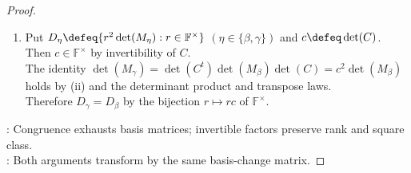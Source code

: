 \begin{proposition}
\begin{proof}
\begin{enumerate}[label=(\roman*)]
Thus $\operatorname{rank}(M_{\gamma})=\operatorname{rank}(M_{\beta})$ by (ii) and Theorem \ref{thm:full-rank-products-preserve-rank}(ii).
\item[$(v)$] Put $D_{\eta}\defeq\{r^2\det(M_{\eta}):r\in\mathbb{F}^{\times}\}$ $(\eta\in\{\beta,\gamma\})$ and $c\defeq\det(C)$. Then $c\in\mathbb{F}^{\times}$ by invertibility of $C$.\\
The identity $\det(M_{\gamma})=\det(C^t)\det(M_{\beta})\det(C)=c^2\det(M_{\beta})$ holds by (ii) and the determinant product and transpose laws.\\
Therefore $D_{\gamma}=D_{\beta}$ by the bijection $r\mapsto rc$ of $\mathbb{F}^{\times}$.
\end{enumerate}
: Congruence exhausts basis matrices; invertible factors preserve rank and square class.\\
: Both arguments transform by the same basis-change matrix.
\end{proof}
\end{proposition}
